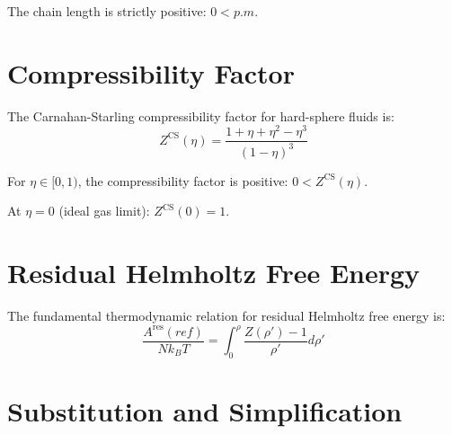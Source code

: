 \begin{theorem}
\label{thm:m_pos}
\leanok
The chain length is strictly positive: $0 < p.m$.
\end{theorem}

\section{Compressibility Factor}

\begin{definition}
\label{def:cs_compressibility_factor}
\leanok
The Carnahan-Starling compressibility factor for hard-sphere fluids is:
$$Z^{\text{CS}}(\eta) = \frac{1 + \eta + \eta^2 - \eta^3}{(1 - \eta)^3}$$
\end{definition}

\begin{theorem}
\label{thm:cs_compressibility_factor_pos}
\leanok
For $\eta \in [0,1)$, the compressibility factor is positive: $0 < Z^{\text{CS}}(\eta)$.
\end{theorem}

\begin{theorem}
\label{thm:cs_compressibility_factor_at_zero}
\leanok
At $\eta = 0$ (ideal gas limit): $Z^{\text{CS}}(0) = 1$.
\end{theorem}

\section{Residual Helmholtz Free Energy}

\begin{definition}
\label{def:helmholtz_from_z}
\leanok
The fundamental thermodynamic relation for residual Helmholtz free energy is:
$$\frac{A^{\text{res}}(ref)}{Nk_BT} = \int_0^\rho \frac{Z(\rho') - 1}{\rho'} d\rho'$$
\end{definition}

\section{Substitution and Simplification}

